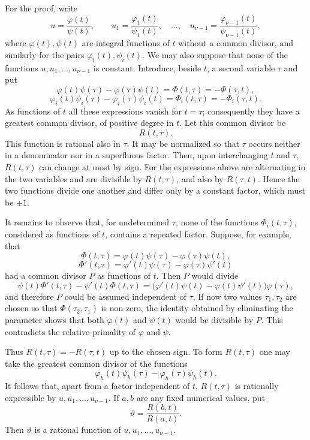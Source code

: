 \documentclass[11pt,a4paper]{book}
\begin{document}
For the proof, write
\begin{equation}
 u=\frac{\varphi(t)}{\psi(t)},\qquad
 u_1=\frac{\varphi_1(t)}{\psi_1(t)},\quad\ldots,\quad
 u_{\nu-1}=\frac{\varphi_{\nu-1}(t)}{\psi_{\nu-1}(t)},
\end{equation}
where $\varphi(t),\psi(t)$ are integral functions of $t$ without a common divisor, and similarly for the pairs $\varphi_i(t),\psi_i(t)$.  We may also suppose that none of the functions $u,u_1,\ldots,u_{\nu-1}$ is constant.  Introduce, beside $t$, a second variable $\tau$ and put
\[
 \varphi(t)\psi(\tau)-\varphi(\tau)\psi(t)=\Phi(t,\tau)=-\Phi(\tau,t),
\]
\[
 \varphi_i(t)\psi_i(\tau)-\varphi_i(\tau)\psi_i(t)=\Phi_i(t,\tau)=-\Phi_i(\tau,t).
\]
As functions of $t$ all these expressions vanish for $t=\tau$; consequently they have a greatest common divisor, of positive degree in $t$.  Let this common divisor be
\begin{equation}
 R(t,\tau).
\end{equation}
This function is rational also in $\tau$.  It may be normalized so that $\tau$ occurs neither in a denominator nor in a superfluous factor.  Then, upon interchanging $t$ and $\tau$, $R(t,\tau)$ can change at most by sign.  For the expressions above are alternating in the two variables and are divisible by $R(t,\tau)$, and also by $R(\tau,t)$.  Hence the two functions divide one another and differ only by a constant factor, which must be $\pm1$.

It remains to observe that, for undetermined $\tau$, none of the functions $\Phi_i(t,\tau)$, considered as functions of $t$, contains a repeated factor.  Suppose, for example, that
\[
 \Phi(t,\tau)=\varphi(t)\psi(\tau)-\varphi(\tau)\psi(t),
\]
\[
 \Phi'(t,\tau)=\varphi'(t)\psi(\tau)-\varphi(\tau)\psi'(t)
\]
had a common divisor $P$ as functions of $t$.  Then $P$ would divide
\[
 \psi(t)\Phi'(t,\tau)-\psi'(t)\Phi(t,\tau)
  =\bigl(\varphi'(t)\psi(t)-\varphi(t)\psi'(t)\bigr)\varphi(\tau),
\]
and therefore $P$ could be assumed independent of $\tau$.  If now two values $\tau_1,\tau_2$ are chosen so that $\Phi(\tau_2,\tau_1)$ is non-zero, the identity obtained by eliminating the parameter shows that both $\varphi(t)$ and $\psi(t)$ would be divisible by $P$.  This contradicts the relative primality of $\varphi$ and $\psi$.

Thus $R(t,\tau)=-R(\tau,t)$ up to the chosen sign.  To form $R(t,\tau)$ one may take the greatest common divisor of the functions
\[
 \varphi_h(t)\psi_h(\tau)-\varphi_h(\tau)\psi_h(t).
\]
It follows that, apart from a factor independent of $t$, $R(t,\tau)$ is rationally expressible by $u,u_1,\ldots,u_{\nu-1}$.  If $a,b$ are any fixed numerical values, put
\begin{equation}
 \vartheta=\frac{R(b,t)}{R(a,t)}.
\end{equation}
Then $\vartheta$ is a rational function of $u,u_1,\ldots,u_{\nu-1}$.
\end{document}
